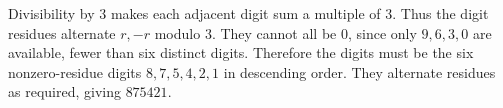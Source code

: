 Divisibility by $3$ makes each adjacent digit sum a multiple of $3$. Thus the digit residues alternate $r,-r$ modulo $3$. They cannot all be $0$, since only $9,6,3,0$ are available, fewer than six distinct digits. Therefore the digits must be the six nonzero-residue digits $8,7,5,4,2,1$ in descending order. They alternate residues as required, giving $\boxed{875421}$.
